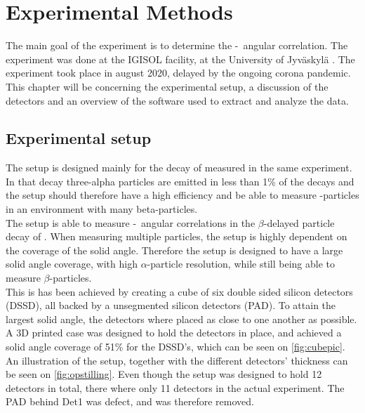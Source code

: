 \chapter{Experimental Methods}
The main goal of the experiment is to determine the \be-\al\ angular correlation. The experiment was done at the IGISOL facility, at the University of Jyväskylä \cite{igisol}. The experiment took place in august 2020, delayed by the ongoing corona pandemic. This chapter will be concerning the experimental setup, a discussion of the detectors and an overview of the software used to extract and analyze the data. 


\section{Experimental setup}
The setup is designed mainly for the decay of  measured in the same experiment. In that decay three-alpha particles are emitted in less than 1\% of the decays and the setup should therefore have a high efficiency and be able to measure \al-particles in an environment with many beta-particles. \\

The setup is able to measure \be-\al\ angular correlations in the $\beta$-delayed particle decay of . When measuring multiple particles, the setup is highly dependent on the coverage of the solid angle. Therefore the setup is designed to have a large solid angle coverage, with high $\alpha$-particle resolution, while still being able to measure $\beta$-particles.\\
This is has been achieved by creating a cube of six double sided silicon detectors (DSSD), all backed by a unsegmented silicon detectors (PAD). To attain the largest solid angle, the detectors where placed as close to one another as possible. A 3D printed case was designed to hold the detectors in place, and achieved a solid angle coverage of 51\% for the DSSD's, which can be seen on \cref{fig:cubepic}. An illustration of the setup, together with the different detectors' thickness can be seen on \cref{fig:opstilling}. 
Even though the setup was designed to hold 12 detectors in total, there where only 11 detectors in the actual experiment. The PAD behind Det1 was defect, and was therefore removed. 

